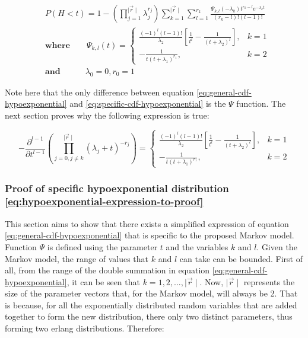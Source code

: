 \begin{align} \label{eq:specific-cdf-hypoexponential}
    & P(H < t) = 1 - \left( \prod_{j=1}^{\mid \vec{r} \mid} \lambda_j^{r_j} \right) 
    \sum_{k=1}^{\mid \vec{r} \mid} \sum_{l=1}^{r_k} \frac{\Psi_{k,l}(-\lambda_k)t^{r_k - l} 
    e^{-\lambda_k t}}{(r_k - l)! (l - 1)!} \nonumber \\ 
    & \textbf{where} \qquad \Psi_{k,l}(t) = 
    \begin{cases} 
        \frac{(-1)^{l} (l-1)!}{\lambda_2} \left[\frac{1}{t^l} - \frac{1}
        {(t + \lambda_2)^l}\right] , & k=1 \\
        - \frac{1}{t (t + \lambda_1)^{r_1}}, & k=2
    \end{cases} \nonumber \\
    & \textbf{and} \quad \qquad \lambda_0 = 0, r_0 = 1
\end{align}

Note here that the only difference between equation 
\ref{eq:general-cdf-hypoexponential} and \ref{eq:specific-cdf-hypoexponential} 
is the \(\Psi\) function. The next section proves why the following expression 
is true:

\begin{equation} \label{eq:hypoexponential-expression-to-proof}
    - \frac{\partial^{l - 1}}{\partial t ^{l - 1}} 
    \left( \prod_{j = 0, j \neq k}^{\mid \vec{r} \mid} (\lambda_j + t)^{-r_j} \right) = 
    \begin{cases} 
        \frac{(-1)^{l} (l-1)!}{\lambda_2} \left[\frac{1}{t^l} - \frac{1}
        {(t + \lambda_2)^l}\right] , & k=1 \\
        - \frac{1}{t (t + \lambda_1)^{r_1}}, & k=2
    \end{cases}
\end{equation}



\subsubsection{Proof of specific hypoexponential distribution 
\ref{eq:hypoexponential-expression-to-proof}}
 
This section aims to show that there exists a simplified expression of equation 
\ref{eq:general-cdf-hypoexponential} that is specific to the proposed Markov 
model.
Function \(\Psi\) is defined using the parameter \(t\) and the variables \(k\) 
and \(l\).
Given the Markov model, the range of values that \(k\) and \(l\) can take can be
bounded.
First of all, from the range of the double summation in equation 
\ref{eq:general-cdf-hypoexponential}, it can be seen that 
\(k = 1, 2, \dots, \mid \vec{r} \mid\).
Now, \(\mid \vec{r} \mid\) represents the size of the parameter vectors that, 
for the Markov model, will always be 2. 
That is because, for all the exponentially distributed random variables that are
added together to form the new distribution, there only two distinct parameters,
thus forming two erlang distributions. Therefore:


